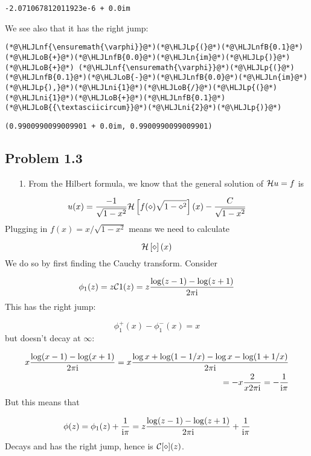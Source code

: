 \documentclass[12pt,a4paper]{article}
\newcommand{\HLJLn}[1]{#1}
\newcommand{\HLJLnf}[1]{\textcolor[RGB]{66,102,213}{#1}}
\newcommand{\HLJLnfB}[1]{\textcolor[RGB]{59,151,46}{#1}}
\newcommand{\HLJLni}[1]{\textcolor[RGB]{59,151,46}{#1}}
\newcommand{\HLJLoB}[1]{\textcolor[RGB]{102,102,102}{\textbf{#1}}}
\newcommand{\HLJLp}[1]{#1}
\def\I{ {\rm i} }
\def\CC{ {\cal C} }
\def\HH{ {\cal H} }
\begin{document}
\begin{lstlisting}
-2.071067812011923e-6 + 0.0im
\end{lstlisting}


We see also that it has the right jump:


\begin{lstlisting}
(*@\HLJLnf{\ensuremath{\varphi}}@*)(*@\HLJLp{(}@*)(*@\HLJLnfB{0.1}@*)(*@\HLJLoB{+}@*)(*@\HLJLnfB{0.0}@*)(*@\HLJLn{im}@*)(*@\HLJLp{)}@*) (*@\HLJLoB{+}@*) (*@\HLJLnf{\ensuremath{\varphi}}@*)(*@\HLJLp{(}@*)(*@\HLJLnfB{0.1}@*)(*@\HLJLoB{-}@*)(*@\HLJLnfB{0.0}@*)(*@\HLJLn{im}@*)(*@\HLJLp{),}@*)(*@\HLJLni{1}@*)(*@\HLJLoB{/}@*)(*@\HLJLp{(}@*)(*@\HLJLni{1}@*)(*@\HLJLoB{+}@*)(*@\HLJLnfB{0.1}@*)(*@\HLJLoB{{\textasciicircum}}@*)(*@\HLJLni{2}@*)(*@\HLJLp{)}@*)
\end{lstlisting}

\begin{lstlisting}
(0.9900990099009901 + 0.0im, 0.9900990099009901)
\end{lstlisting}


\subsection{Problem 1.3}
\begin{itemize}
\item[1. ] From the Hilbert formula, we know that the general solution of $\HH u = f$ is

\end{itemize}
\[
    u(x) =  {-1 \over \sqrt{1 - x^2}}\HH \left[{ f(\diamond)  \sqrt{1-\diamond^2} }\right](x)  - {C \over \sqrt{1-x^2}}
\]
Plugging in $f(x) = x/\sqrt{1-x^2}$ means we need to calculate

\[
\HH \left[{\diamond}\right](x)
\]
We do so by first finding the Cauchy transform. Consider

\[
\phi_1(z) = z \CC 1(z) = z {\log(z-1) - \log(z+1) \over 2 \pi \I}
\]
This has the right jump:

\[
\phi_1^+(x) - \phi_1^-(x) = x
\]
but doesn't decay at $\infty$:


\begin{align*}
x {\log(x-1) - \log(x+1) \over 2 \pi \I} = x {\log x + \log(1-1/x) - \log x -\log(1+1/x) \over 2 \pi \I} \\
= -x { 2 \over x 2 \pi \I}  = -{1 \over \I \pi}
\end{align*}
But this means that

\[
\phi(z) = \phi_1(z) + {1 \over \I \pi} = z {\log(z-1) - \log(z+1) \over 2 \pi \I}  + {1 \over \I \pi}
\]
Decays and has the right jump, hence is $\CC[\diamond](z)$.
\end{document}
